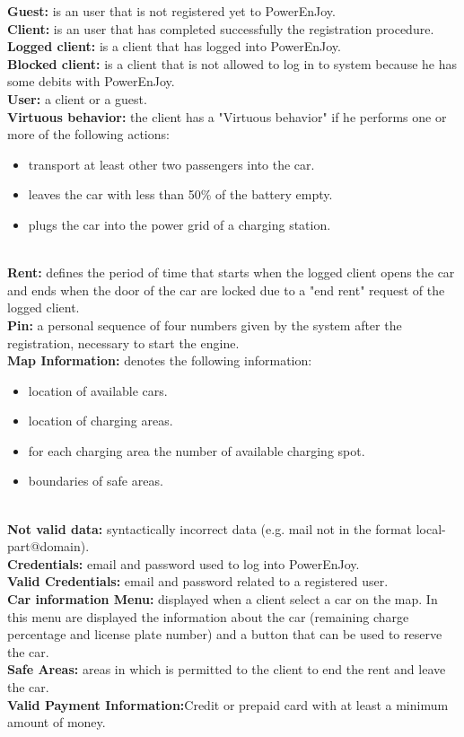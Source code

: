 \textbf{Guest:}
 is an user that is not registered yet to PowerEnJoy.\\
\textbf{Client:}
is an user that has completed successfully the registration procedure.\\
\textbf{Logged client:}
is a client that has logged into PowerEnJoy.\\
\textbf{Blocked client:}
is a client that is not allowed to log in to system because he has some debits with PowerEnJoy.\\
\textbf{User:}
a client or a guest.\\
\textbf{Virtuous  behavior:}
the client has a "Virtuous behavior" if he performs one or more of the following actions: 
\begin{itemize}
\item transport at least other two passengers into the car.
\item leaves the car with less than 50\% of the battery empty.
\item plugs the car into the power grid of a charging station.
\end{itemize}
\emph{\\}
\textbf{Rent:} defines the period of time that starts when the logged client opens the car and ends when the door of the car are locked due to a "end rent" request of the logged client.\\
\textbf{Pin:} a personal sequence of four numbers given by the system after the registration, necessary to start the engine.\\
\textbf{Map Information:}
denotes the following information: 
\begin{itemize}
\item location of available cars.
\item location of charging areas.
\item for each charging area the number of available charging spot.
\item boundaries of safe areas.
\end{itemize}
\emph{\\}
\textbf{Not valid data:}
syntactically incorrect data (e.g. mail not in the format local-part@domain).\\
\textbf{Credentials:}
email and password used to log into PowerEnJoy.\\
\textbf{Valid Credentials:}
email and password related to a registered user.\\
\textbf{Car information Menu:}
displayed when a client select a car on the map. In this menu are displayed the information about the car (remaining charge percentage and license plate number) and a button that can be used to reserve the car.\\
\textbf{Safe Areas:} 
areas in which is permitted to the client to end the rent and leave the car.\\
\textbf{Valid Payment Information:}Credit or prepaid card with at least a minimum amount of money.\\

